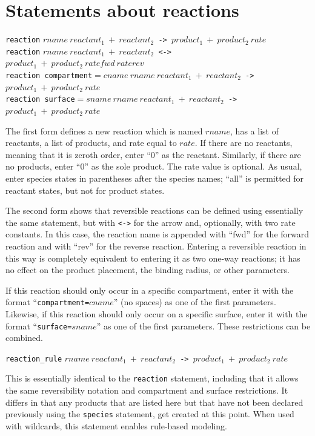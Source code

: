 \documentclass {scrbook}
\newcommand {\ttt} {\texttt}
\begin{document}
\section{Statements about reactions}

\begin{description}

\item{\ttt{reaction} $rname\ reactant_1\ +\ reactant_2$\ttt{ -> }$product_1\ +\ product_2\ rate$\\
\ttt{reaction} $rname\ reactant_1\ +\ reactant_2$\ttt{ <-> }$product_1\ +\ product_2\ ratefwd\ raterev$\\
\ttt{reaction compartment}$=cname\ rname\ reactant_1\ +\ reactant_2$\ttt{ -> }$product_1\ +\ product_2\ rate$\\
\ttt{reaction surface}$=sname\ rname\ reactant_1\ +\ reactant_2$\ttt{ -> }$product_1\ +\ product_2\ rate$}

The first form defines a new reaction which is named $rname$, has a list of reactants, a list of products, and rate equal to $rate$. If there are no reactants, meaning that it is zeroth order, enter ``0'' as the reactant. Similarly, if there are no products, enter ``0'' as the sole product. The rate value is optional. As usual, enter species states in parentheses after the species names; ``all'' is permitted for reactant states, but not for product states.

The second form shows that reversible reactions can be defined using essentially the same statement, but with \ttt{<->} for the arrow and, optionally, with two rate constants. In this case, the reaction name is appended with ``fwd'' for the forward reaction and with ``rev'' for the reverse reaction. Entering a reversible reaction in this way is completely equivalent to entering it as two one-way reactions; it has no effect on the product placement, the binding radius, or other parameters.

If this reaction should only occur in a specific compartment, enter it with the format ``\ttt{compartment=}$cname$'' (no spaces) as one of the first parameters. Likewise, if this reaction should only occur on a specific surface, enter it with the format ``\ttt{surface=}$sname$'' as one of the first parameters. These restrictions can be combined.

\item{\ttt{reaction\_rule} $rname\ reactant_1\ +\ reactant_2$\ttt{ -> }$product_1\ +\ product_2\ rate$}

This is essentially identical to the \ttt{reaction} statement, including that it allows the same reversibility notation and compartment and surface restrictions. It differs in that any products that are listed here but that have not been declared previously using the \ttt{species} statement, get created at this point. When used with wildcards, this statement enables rule-based modeling.


\end{description}
\end{document}

